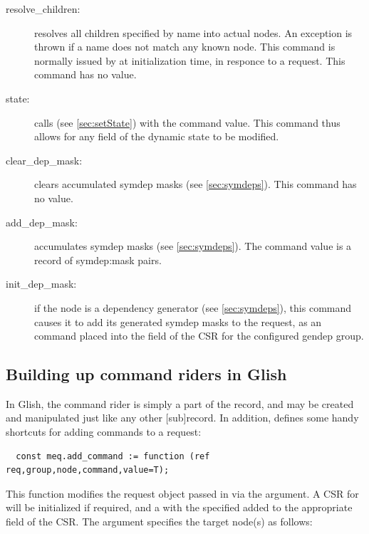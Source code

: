   \begin{description}
  
  \item[resolve\_children:] resolves all children specified by name into actual
  nodes. An exception is thrown if a name does not match any known node. This
  command is normally issued by  at initialization time, in
  responce to a  request. This command has no value.
  
  \item[state:] calls  (see \ref{sec:setState}) with the command
   value. This command thus allows for any field of the dynamic state to be
   modified.
   
  \item[clear\_dep\_mask:] clears accumulated symdep masks (see
  \ref{sec:symdeps}). This command has no value.
  
  \item[add\_dep\_mask:] accumulates symdep masks (see \ref{sec:symdeps}). The
  command value is a record of symdep:mask pairs.

  \item[init\_dep\_mask:] if the node is a dependency generator (see
  \ref{sec:symdeps}), this command causes it to add its generated symdep
  masks to the request, as an  command placed into
  the  field of the CSR for the configured gendep group.
  
  \end{description}

\subsection{Building up command riders in Glish}

  In Glish, the command rider is simply a part of the  record, and
  may be created and manipulated just like any other [sub]record. In addition,
   defines some handy shortcuts for adding commands to a
  request:
  
  \begin{verbatim}
  const meq.add_command := function (ref req,group,node,command,value=T);
  \end{verbatim}

  This function modifies the request object passed in via the 
  argument. A CSR for  will be initialized if required, and a
   with the specified  added to the appropriate field of
  the CSR. The  argument specifies the target node(s) as follows:

